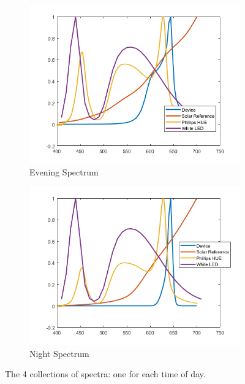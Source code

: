 \begin{figure}[hbt]
\begin{subfigure}[h]{0.4\textwidth}
	\includegraphics[width=\textwidth]{Images/Spectra/Evening.png}
	\caption{Evening Spectrum}
\end{subfigure}
\begin{subfigure}[h]{0.4\textwidth}
	\includegraphics[width=\textwidth]{Images/Spectra/Night.png}
	\caption{Night Spectrum}
\end{subfigure}
\caption{The 4 collections of spectra: one for each time of day. }
\label{Fig:Spectra}
\end{figure}
\clearpage

